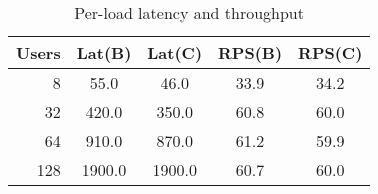 \begin{table}[t]
\caption{Per-load latency and throughput}
\centering
\begin{tabular}{r|cc|cc}
Users & Lat(B) & Lat(C) & RPS(B) & RPS(C) \\
\hline
8 & 55.0 & 46.0 & 33.9 & 34.2 \\
32 & 420.0 & 350.0 & 60.8 & 60.0 \\
64 & 910.0 & 870.0 & 61.2 & 59.9 \\
128 & 1900.0 & 1900.0 & 60.7 & 60.0 \\
\end{tabular}
\end{table}
